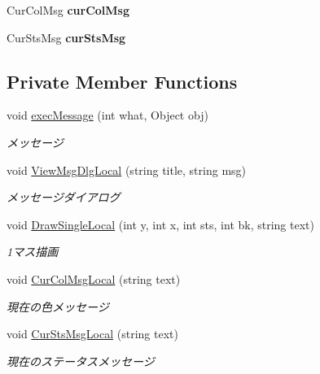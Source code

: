 \begin{DoxyCompactItemize}
\item 
Cur\+Col\+Msg {\bfseries cur\+Col\+Msg}\hypertarget{class_reversi4color_wpf_1_1_reversi_play_afb0e3b19c248dd603e0b26d480cfec3c}{}\label{class_reversi4color_wpf_1_1_reversi_play_afb0e3b19c248dd603e0b26d480cfec3c}

\item 
Cur\+Sts\+Msg {\bfseries cur\+Sts\+Msg}\hypertarget{class_reversi4color_wpf_1_1_reversi_play_af41da06e7780192422ce12987883bd14}{}\label{class_reversi4color_wpf_1_1_reversi_play_af41da06e7780192422ce12987883bd14}

\end{DoxyCompactItemize}
\subsection*{Private Member Functions}
\begin{DoxyCompactItemize}
\item 
void \hyperlink{class_reversi4color_wpf_1_1_reversi_play_ababce684128da36e97a45ad8a13e4b71}{exec\+Message} (int what, Object obj)
\begin{DoxyCompactList}\small\item\em メッセージ \end{DoxyCompactList}\item 
void \hyperlink{class_reversi4color_wpf_1_1_reversi_play_a04d48302d3d83031b891697144041368}{View\+Msg\+Dlg\+Local} (string title, string msg)
\begin{DoxyCompactList}\small\item\em メッセージダイアログ \end{DoxyCompactList}\item 
void \hyperlink{class_reversi4color_wpf_1_1_reversi_play_a12e412e027b1e55abf3d767626a6f1d9}{Draw\+Single\+Local} (int y, int x, int sts, int bk, string text)
\begin{DoxyCompactList}\small\item\em 1マス描画 \end{DoxyCompactList}\item 
void \hyperlink{class_reversi4color_wpf_1_1_reversi_play_ab28025c8262b1f7fb97de3b7796a2650}{Cur\+Col\+Msg\+Local} (string text)
\begin{DoxyCompactList}\small\item\em 現在の色メッセージ \end{DoxyCompactList}\item 
void \hyperlink{class_reversi4color_wpf_1_1_reversi_play_ac370dc8e96852754f9c4846a3d2a49c6}{Cur\+Sts\+Msg\+Local} (string text)
\begin{DoxyCompactList}\small\item\em 現在のステータスメッセージ \end{DoxyCompactList}\end{DoxyCompactItemize}
